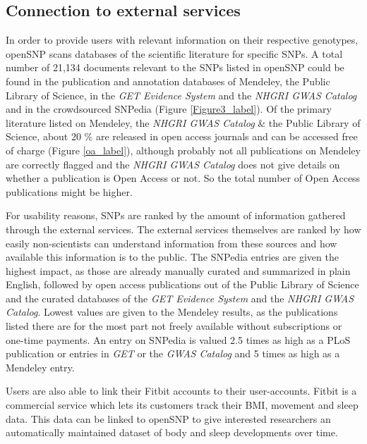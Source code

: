 \documentclass[10pt]{article}
\begin{document}
\subsection*{Connection to external services}
In order to provide users with relevant information on their respective genotypes, openSNP scans databases of the scientific literature for specific SNPs. 
A total number of 21,134 documents relevant to the SNPs listed in openSNP could be found in the publication and annotation databases of Mendeley, the Public Library of Science, in the \emph{GET Evidence System} \cite{Ball24072012} and the \emph{NHGRI GWAS Catalog} \cite{Hindorff2009} and in the crowdsourced SNPedia (Figure \ref{Figure3_label}).
Of the primary literature listed on Mendeley, the \emph{NHGRI GWAS Catalog} \& the Public Library of Science, about 20 \% are released in open access journals and can be accessed free of charge (Figure \ref{oa_label}), although probably not all publications on Mendeley are correctly flagged and the \emph{NHGRI GWAS Catalog} does not give details on whether a publication is Open Access or not. So the total number of Open Access publications might be higher. 

For usability reasons, 
SNPs are ranked by the amount of information gathered through the external services. The external services themselves are ranked by how easily non-scientists can understand information 
from these sources and how available this information is to the public. The SNPedia entries are given the highest impact, as those are already manually curated and summarized in plain English, followed by open access publications out of 
the Public Library of Science and the curated databases of the \emph{GET Evidence System} and the \emph{NHGRI GWAS Catalog}. Lowest values are given to the Mendeley results, as the publications listed there are for the most part not freely available without subscriptions or one-time payments. 
An entry on SNPedia is valued 2.5 times as high as a PLoS publication or entries in \emph{GET} or the \emph{GWAS Catalog} and 5 times as high as a Mendeley entry. 

Users are also able to link their Fitbit\cite{fitbit} accounts to their user-accounts. Fitbit is a commercial service which lets its customers track their BMI, movement and sleep data. This data can be linked to openSNP to give interested researchers an automatically maintained dataset of body and sleep developments over time.
\end{document}

